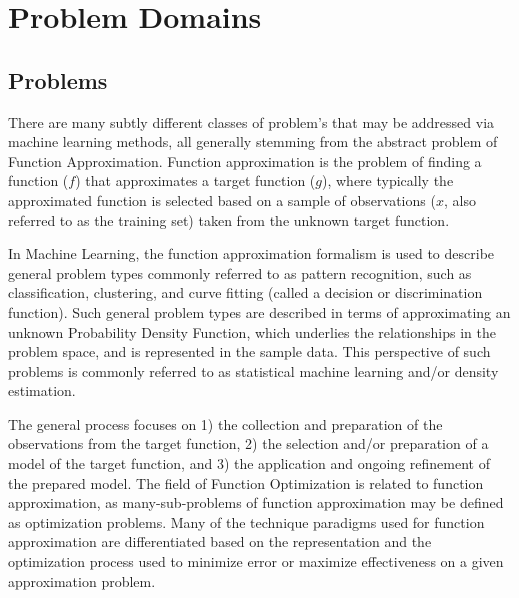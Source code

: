 
\section{Problem Domains} 
\label{intro:problemdomains}

\subsection{Problems}
\label{subsec:problems}
There are many subtly different classes of problem's that may be addressed via machine learning methods, all generally stemming from the abstract problem of Function Approximation. Function approximation is the problem of finding a function ($f$) that approximates a target function ($g$), where typically the approximated function is selected based on a sample of observations ($x$, also referred to as the training set) taken from the unknown target function.

In Machine Learning, the function approximation formalism is used to describe general problem types commonly referred to as pattern recognition, such as classification, clustering, and curve fitting (called a decision or discrimination function). Such general problem types are described in terms of approximating an unknown Probability Density Function, which underlies the relationships in the problem space, and is represented in the sample data. This perspective of such problems is commonly referred to as statistical machine learning and/or density estimation.

The general process focuses on 1) the collection and preparation of the observations from the target function, 2) the selection and/or preparation of a model of the target function, and 3) the application and ongoing refinement of the prepared model. 
The field of Function Optimization is related to function approximation, as many-sub-problems of function approximation may be defined as optimization problems. Many of the technique paradigms used for function approximation are differentiated based on the representation and the optimization process used to minimize error or maximize effectiveness on a given approximation problem.

